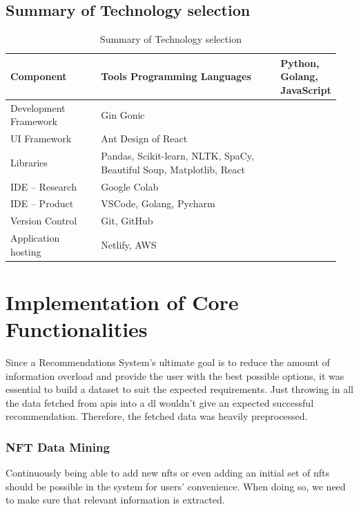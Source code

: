 \subsection{Summary of Technology selection}
\vspace{-4mm}
\begin{longtable}{|p{0.3\linewidth}|p{0.65\linewidth}|}
\caption{Summary of Technology selection}\\ 
\hline
\textbf{Component} & \textbf{Tools}\endfirsthead 
\hline
Programming Languages & Python, Golang, JavaScript \\
\hline
Development Framework & Gin Gonic \\
\hline
UI Framework & Ant Design of React \\
\hline
Libraries & Pandas, Scikit-learn, NLTK, SpaCy, Beautiful Soup, Matplotlib, React \\
\hline
IDE – Research & Google Colab \\
\hline
IDE – Product & VSCode, Golang, Pycharm \\
\hline
Version Control & Git, GitHub \\
\hline
Application hosting & Netlify, AWS
\\
\hline
\end{longtable}


\section{Implementation of Core Functionalities}

Since a Recommendations System's ultimate goal is to reduce the amount of information overload and provide the user with the best possible options, it was essential to build a dataset to suit the expected requirements. Just throwing in all the data fetched from \gls{api}s into a \gls{dl} wouldn't give an expected successful recommendation. Therefore, the fetched data was heavily preprocessed.

\subsubsection{NFT Data Mining}
Continuously being able to add new \gls{nft}s or even adding an initial set of \gls{nft}s should be possible in the system for users' convenience. When doing so, we need to make sure that relevant information is extracted.

